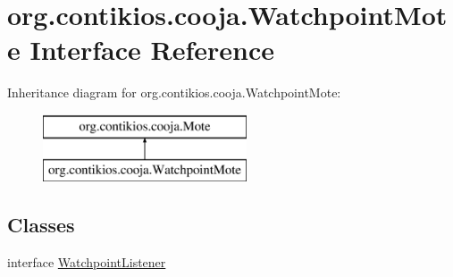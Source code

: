 \hypertarget{interfaceorg_1_1contikios_1_1cooja_1_1WatchpointMote}{\section{org.\-contikios.\-cooja.\-Watchpoint\-Mote Interface Reference}
\label{interfaceorg_1_1contikios_1_1cooja_1_1WatchpointMote}
}
Inheritance diagram for org.\-contikios.\-cooja.\-Watchpoint\-Mote\-:\begin{figure}[H]
\begin{center}
\leavevmode
\includegraphics[height=2.000000cm]{interfaceorg_1_1contikios_1_1cooja_1_1WatchpointMote}
\end{center}
\end{figure}
\subsection*{Classes}
\begin{DoxyCompactItemize}
\item 
interface \hyperlink{interfaceorg_1_1contikios_1_1cooja_1_1WatchpointMote_1_1WatchpointListener}{Watchpoint\-Listener}
\end{DoxyCompactItemize}
